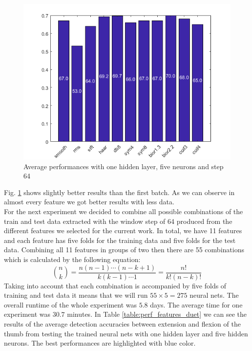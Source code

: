 \begin{figure}[h!]
\includegraphics[width=15cm,left,keepaspectratio]{figures/HL1HN5step64}
\caption{Average performances with one hidden layer, five neurons and step 64}
\label{fig:HL1HN5step64}
\end{figure}
Fig. \ref{fig:HL1HN5step64} shows slightly better results than the first batch. As we can observe in almost every feature we got better results with less data.\\
For the next experiment we decided to combine all possible combinations of the train and test data extracted  with the window step of 64 produced from the different features we selected for the current work. In total, we have 11  features and each feature has five folds for the training data and five folds for the test data. Combining all 11 features in groups of two then there are 55 combinations which is calculated by the following equation:
\begin{equation}
\binom{n}{k} = \frac{n(n-1) \cdots (n-k+1)}{k(k-1) \cdots 1} = \frac{n!}{k!(n-k)!}
\end{equation}
Taking into account that each combination is accompanied by five folds of training and test data it means that we will run $55 \times 5 = 275$ neural nets. The overall runtime of the whole experiment was $5.8$ days. The average time for one experiment was $30.7$ minutes.
In Table \ref{table:perf_features_duet} we can see the results of the average detection accuracies between extension and flexion of the thumb from testing the trained neural nets with one hidden layer and five hidden neurons. The best performances are highlighted with blue color.
